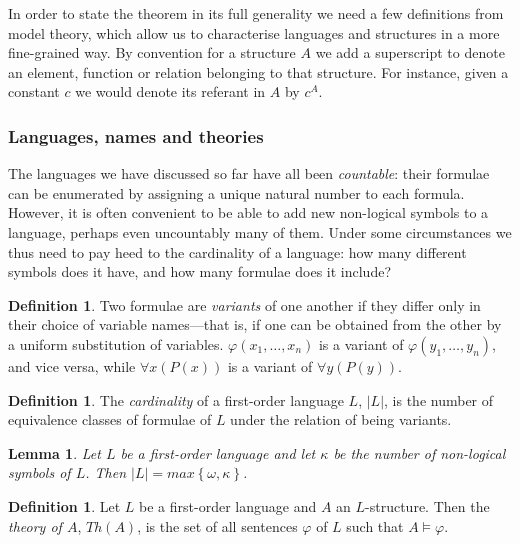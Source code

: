 \documentclass[10pt, a4paper, oneside]{article}
\theoremstyle{definition}
\newtheorem{dfn}[thm]{Definition}
\theoremstyle{remark}
\theoremstyle{plain}
\newtheorem{lem}[thm]{Lemma}
\theoremstyle{plain}
\begin{document}
In order to state the theorem in its full generality we need a few definitions
from model theory, which allow us to characterise languages and structures in a
more fine-grained way. By convention for a structure $A$ we add a superscript to
denote an element, function or relation belonging to that structure. For
instance, given a constant $c$ we would denote its referant in $A$ by $c^A$.

\subsubsection{Languages, names and theories}

The languages we have discussed so far have all been \emph{countable}: their
formulae can be enumerated by assigning a unique natural number to each formula.
However, it is often convenient to be able to add new non-logical symbols to a
language, perhaps even uncountably many of them. Under some circumstances we
thus need to pay heed to the cardinality of a language: how many different
symbols does it have, and how many formulae does it include?

\begin{dfn}
    Two formulae are \emph{variants} of one another if they differ only in their
    choice of variable names---that is, if one can be obtained from the other by
    a uniform substitution of variables. $\varphi(x_1, \dotsc, x_n)$ is a
    variant of $\varphi(y_1, \dotsc, y_n)$, and vice versa, while
    $\forall{x} (P(x))$ is a variant of $\forall{y} (P(y))$.
\end{dfn}

\begin{dfn}
    The \emph{cardinality} of a first-order language $L$, $|L|$, is the number
    of equivalence classes of formulae of $L$ under the relation of being
    variants.
\end{dfn}

\begin{lem}
    \label{lem:lang_card}
    Let $L$ be a first-order language and let $\kappa$ be the number of
    non-logical symbols of $L$. Then $|L| = max \left\{ \omega, \kappa \right\}$.
\end{lem}

\begin{dfn}
    Let $L$ be a first-order language and $A$ an $L$-structure. Then the
    \emph{theory of $A$}, $Th(A)$, is the set of all sentences $\varphi$ of $L$
    such that $A \models \varphi$.
\end{dfn}
\end{document}
